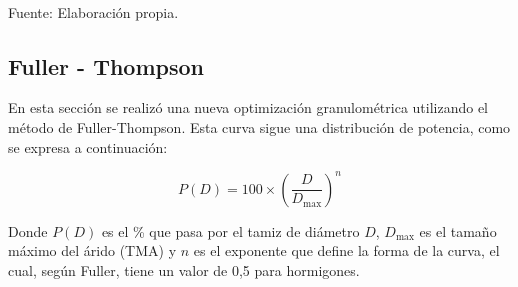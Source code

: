 \begin{table}[H]
\centering
\caption{Corrección por humedad (TMA = 9{,}5 mm).}
\label{tab:correccion-humedad}
\setlength{\tabcolsep}{6pt}
\renewcommand{\arraystretch}{1.15}
\small
{}
\\Fuente: Elaboración propia.
\end{table}


\subsection{Fuller - Thompson}

En esta sección se realizó una nueva optimización granulométrica utilizando el método de Fuller-Thompson. Esta curva sigue una distribución de potencia, como se expresa a continuación:

\begin{equation}
    P(D) = 100 \times \left( \frac{D}{D_{\text{max}}} \right)^n
\end{equation}

Donde \(P(D)\) es el \% que pasa por el tamiz de diámetro \(D\), \(D_{\text{max}}\) es el tamaño máximo del árido (TMA) y \(n\) es el exponente que define la forma de la curva, el cual, según Fuller, tiene un valor de 0,5 para hormigones.

